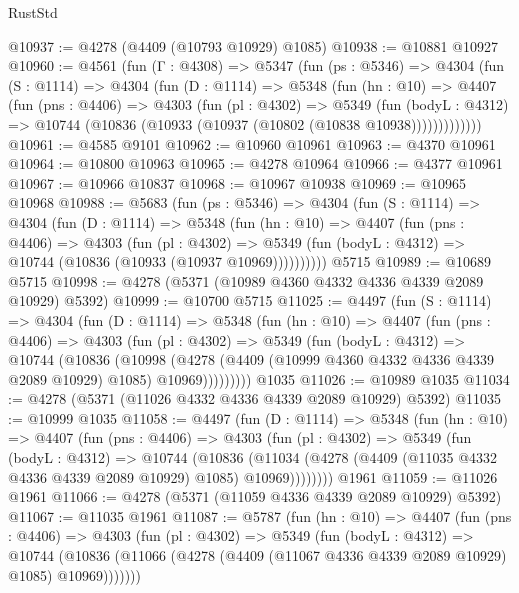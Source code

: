\begin{lexlean}{RustStd}
\begin{coremodule}
{\begin{coremodule}
{{{{{{{{{{{{{{{{{{{{{{{{{{{{{{{{{{{@10937 := @4278 (@4409 (@10793 @10929) @1085)
@10938 := @10881 @10927
@10960 := @4561
    (fun (Γ : @4308) =>
    @5347
      (fun (ps : @5346) =>
      @4304
        (fun (S : @1114) =>
        @4304
          (fun (D : @1114) =>
          @5348
            (fun (hn : @10) =>
            @4407
              (fun (pns : @4406) =>
              @4303
                (fun (pl : @4302) =>
                @5349
                  (fun (bodyL : @4312) =>
                  @10744 (@10836 (@10933 (@10937 (@10802 (@10838 @10938)))))))))))))
@10961 := @4585 @9101
@10962 := @10960 @10961
@10963 := @4370 @10961
@10964 := @10800 @10963
@10965 := @4278 @10964
@10966 := @4377 @10961
@10967 := @10966 @10837
@10968 := @10967 @10938
@10969 := @10965 @10968
@10988 := @5683
    (fun (ps : @5346) =>
    @4304
      (fun (S : @1114) =>
      @4304
        (fun (D : @1114) =>
        @5348
          (fun (hn : @10) =>
          @4407
            (fun (pns : @4406) =>
            @4303
              (fun (pl : @4302) =>
              @5349 (fun (bodyL : @4312) => @10744 (@10836 (@10933 (@10937 @10969))))))))))
    @5715
@10989 := @10689 @5715
@10998 := @4278 (@5371 (@10989 @4360 @4332 @4336 @4339 @2089 @10929) @5392)
@10999 := @10700 @5715
@11025 := @4497
    (fun (S : @1114) =>
    @4304
      (fun (D : @1114) =>
      @5348
        (fun (hn : @10) =>
        @4407
          (fun (pns : @4406) =>
          @4303
            (fun (pl : @4302) =>
            @5349
              (fun (bodyL : @4312) =>
              @10744
                (@10836
                  (@10998
                    (@4278
                      (@4409 (@10999 @4360 @4332 @4336 @4339 @2089 @10929) @1085)
                      @10969)))))))))
    @1035
@11026 := @10989 @1035
@11034 := @4278 (@5371 (@11026 @4332 @4336 @4339 @2089 @10929) @5392)
@11035 := @10999 @1035
@11058 := @4497
    (fun (D : @1114) =>
    @5348
      (fun (hn : @10) =>
      @4407
        (fun (pns : @4406) =>
        @4303
          (fun (pl : @4302) =>
          @5349
            (fun (bodyL : @4312) =>
            @10744
              (@10836
                (@11034 (@4278 (@4409 (@11035 @4332 @4336 @4339 @2089 @10929) @1085) @10969))))))))
    @1961
@11059 := @11026 @1961
@11066 := @4278 (@5371 (@11059 @4336 @4339 @2089 @10929) @5392)
@11067 := @11035 @1961
@11087 := @5787
    (fun (hn : @10) =>
    @4407
      (fun (pns : @4406) =>
      @4303
        (fun (pl : @4302) =>
        @5349
          (fun (bodyL : @4312) =>
          @10744
            (@10836 (@11066 (@4278 (@4409 (@11067 @4336 @4339 @2089 @10929) @1085) @10969)))))))
}}}}}}}}}}}}}}}}}}}}}}}}}}}}}}}}}}}
\end{coremodule}}
\end{coremodule}
\end{lexlean}
